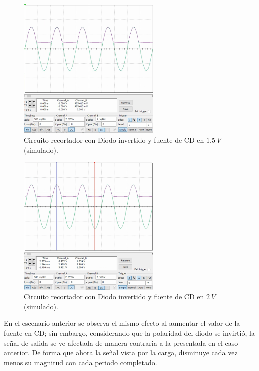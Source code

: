 \documentclass[journal]{IEEEtran}
\begin{document}
\begin{figure}[H]
        \centering
        \includegraphics[width=2.7in]{SignalSimulated_13.png}
        \caption{Circuito recortador con Diodo invertido y fuente de CD en $1.5~V$ (simulado).}
        \label{fig:SignalSimulated_13}
\end{figure}
\begin{figure}[H]
        \centering
        \includegraphics[width=2.7in]{SignalSimulated_14.png}
        \caption{Circuito recortador con Diodo invertido y fuente de CD en $2~V$ (simulado).}
        \label{fig:SignalSimulated_14}
\end{figure}

En el escenario anterior se observa el mismo efecto al aumentar el valor de la fuente en CD; sin embargo, considerando
que la polaridad del diodo se invirtió, la señal de salida se ve afectada de manera contraria a la presentada en el caso anterior.
De forma que ahora la señal vista por la carga, disminuye cada vez menos su magnitud con cada periodo completado.
\end{document}
